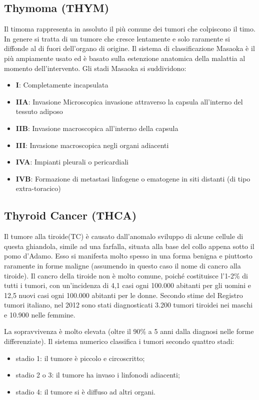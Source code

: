 \documentclass[10pt,a4paper]{report}
\begin{document}
\subsection{Thymoma (THYM)}
Il timoma rappresenta in assoluto il più comune dei tumori che colpiscono il timo. In genere si tratta di un tumore che cresce lentamente e solo raramente si diffonde al di fuori dell'organo di origine. 
Il sistema di classificazione Masaoka è il più ampiamente usato ed è basato sulla estenzione anatomica della malattia al momento dell’intervento. Gli stadi Masaoka si suddividono:
\begin{itemize}
\item \textbf{I}: Completamente incapsulata
\item \textbf{IIA}: Invasione Microscopica invasione attraverso la capsula all’interno del tessuto adiposo
\item \textbf{IIB}: Invasione macroscopica all’interno della capsula 
\item \textbf{III}: Invasione macroscopica negli organi adiacenti
\item \textbf{IVA}: Impianti pleurali o pericardiali 
\item \textbf{IVB}: Formazione di metastasi linfogene o ematogene in siti distanti (di tipo extra-toracico)
\end{itemize}
\newpage
\subsection{Thyroid Cancer (THCA)}
Il tumore alla tiroide(TC) è causato dall'anomalo sviluppo di alcune cellule di questa ghiandola, simile ad una farfalla, situata alla base del collo appena sotto il pomo d'Adamo. Esso si manifesta molto spesso in una forma benigna e piuttosto raramente in forme maligne (assumendo in questo caso il nome di cancro alla tiroide).
Il cancro della tiroide non è molto comune, poiché costituisce l'1-2\% di tutti i tumori, con un'incidenza di 4,1 casi ogni 100.000 abitanti per gli uomini e 12,5 nuovi casi ogni 100.000 abitanti per le donne. Secondo stime del Registro tumori italiano, nel 2012 sono stati diagnosticati 3.200 tumori tiroidei nei maschi e 10.900 nelle femmine.

La sopravvivenza è molto elevata (oltre il 90\% a 5 anni dalla diagnosi nelle forme differenziate).
Il sistema numerico classifica i tumori secondo quattro stadi:
\begin{itemize}
\item stadio 1:  il tumore è piccolo e circoscritto;
\item stadio 2 o 3:  il tumore ha invaso i linfonodi adiacenti;
\item stadio 4:  il tumore si è diffuso ad altri organi.
\end{itemize}
\end{document}

